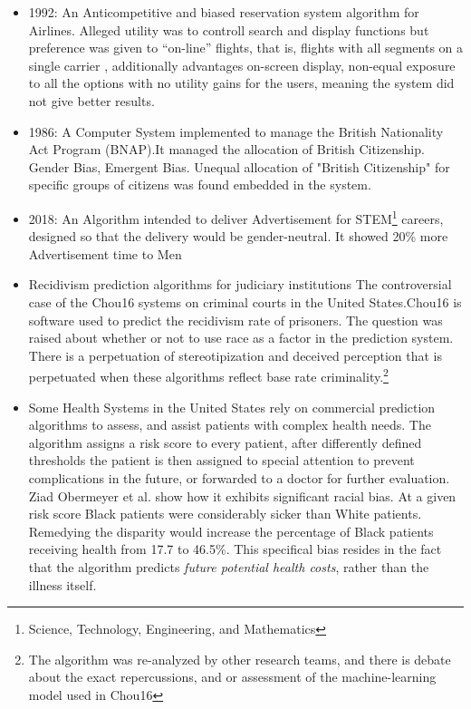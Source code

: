\begin{itemize}
  \item 1992: An Anticompetitive and biased reservation system algorithm for Airlines. Alleged utility was to controll search and display functions but preference was given to “on-line” flights, that is, flights with all segments on a single carrier \cite{Compsysbias}, additionally advantages on-screen display, non-equal exposure to all the options with no utility gains for the users, meaning the system did not give better results.
  \item 1986: A Computer System implemented to manage the British Nationality Act Program (BNAP).It managed the allocation of British Citizenship. Gender Bias, Emergent Bias. Unequal allocation of "British Citizenship" for specific groups of citizens was found embedded in the system.\cite{Compsysbias}
  \item 2018: An Algorithm intended to deliver Advertisement for STEM\footnote{Science, Technology, Engineering, and Mathematics} careers, designed so that the delivery would be gender-neutral. It showed 20\% more Advertisement time to Men \cite{LaTu16}
  \item Recidivism prediction algorithms for judiciary institutions \cite{AyCr18} \cite{DrFa18}
  The controversial case of the Chou16 systems on criminal courts in the United States.Chou16 is software used to predict the recidivism rate of prisoners. The question was raised about whether or not to use race as a factor in the prediction system. \\
  There is a perpetuation of stereotipization and deceived perception that is perpetuated when these algorithms reflect base rate criminality.\footnote{The algorithm was re-analyzed by other research teams, and there is debate about the exact repercussions, and or assessment of the machine-learning model used in Chou16}
  \item Some Health Systems in the United States rely on commercial prediction algorithms to assess, and assist patients with complex health needs. The algorithm assigns a risk score to every patient, after differently defined thresholds the patient is then assigned to special attention to prevent complications in the future, or forwarded to a doctor for further evaluation.  Ziad Obermeyer et al. show how it exhibits significant racial bias\cite{OPVM19}. At a given risk score Black patients were considerably sicker than White patients. Remedying the disparity would increase the percentage of Black patients receiving health from 17.7 to 46.5\%. This specifical bias resides in the fact that the algorithm predicts \textsl{future potential health costs}, rather than the illness itself.


\end{itemize}

